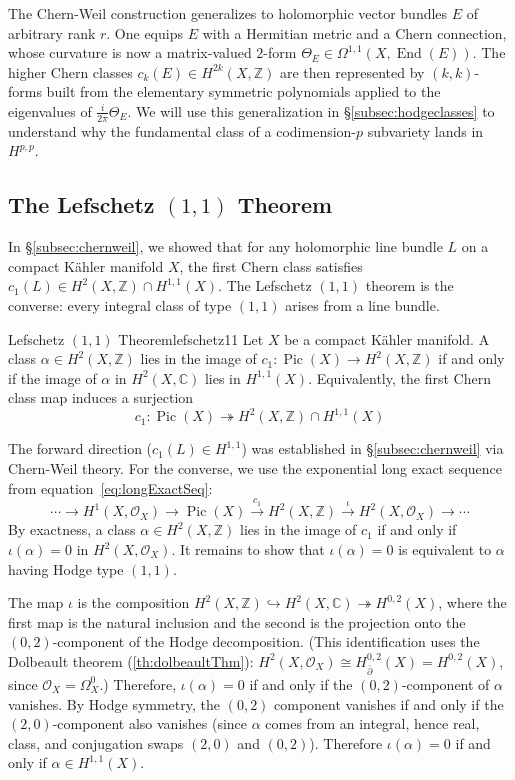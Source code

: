 \documentclass{article}
\newcommand{\C}{\mathbb{C}}
\newcommand{\Z}{{\mathbb{Z}}}
\newcommand{\CO}{\mathcal{O}}
\newcommand{\Pic}{\operatorname{Pic}}
\newcommand{\End}{\operatorname{End}}
\newenvironment{Proof}[1][]
  {\begin{ProofTcb}[#1]}
  {\end{ProofTcb}}
\begin{document}
The Chern-Weil construction generalizes to holomorphic vector bundles $E$ of
arbitrary rank $r$. One equips $E$ with a Hermitian metric and a Chern
connection, whose curvature is now a matrix-valued $2$-form
$\Theta_E \in \Omega^{1,1}(X, \End(E))$. The higher Chern classes
$c_k(E) \in H^{2k}(X, \Z)$ are then represented by $(k,k)$-forms built from
the elementary symmetric polynomials applied to the eigenvalues of
$\frac{i}{2\pi}\Theta_E$. We will use this generalization in
\S\ref{subsec:hodgeclasses} to understand why the fundamental class of a
codimension-$p$ subvariety lands in $H^{p,p}$.

\subsection{The Lefschetz $(1,1)$ Theorem}\label{subsec:lefschetz}

In \S\ref{subsec:chernweil}, we showed that for any holomorphic line bundle $L$
on a compact K\"{a}hler manifold $X$, the first Chern class satisfies
$c_1(L) \in H^2(X, \Z) \cap H^{1,1}(X)$. The Lefschetz $(1,1)$ theorem is the
converse: every integral class of type $(1,1)$ arises from a line bundle.

\begin{thm}{Lefschetz $(1,1)$ Theorem}{lefschetz11}
  Let $X$ be a compact K\"{a}hler manifold. A class
  $\alpha \in H^2(X, \Z)$ lies in the image of
  $c_1: \Pic(X) \to H^2(X, \Z)$ if and only if the image of $\alpha$ in
  $H^2(X, \C)$ lies in $H^{1,1}(X)$. Equivalently, the first Chern class map
  induces a surjection
  \[
    c_1: \Pic(X) \twoheadrightarrow H^2(X, \Z) \cap H^{1,1}(X)
  \]
\end{thm}

\begin{Proof}[sketch]
  The forward direction ($c_1(L) \in H^{1,1}$) was established in
  \S\ref{subsec:chernweil} via Chern-Weil theory. For the converse, we use
  the exponential long exact sequence from equation~\eqref{eq:longExactSeq}:
  \[
    \cdots \longrightarrow H^1(X, \CO_X) \longrightarrow \Pic(X)
      \xrightarrow{\;c_1\;} H^2(X, \Z) \xrightarrow{\;\iota\;}
      H^2(X, \CO_X) \longrightarrow \cdots
  \]
  By exactness, a class $\alpha \in H^2(X, \Z)$ lies in the image of $c_1$ if
  and only if $\iota(\alpha) = 0$ in $H^2(X, \CO_X)$. It remains to show that
  $\iota(\alpha) = 0$ is equivalent to $\alpha$ having Hodge type $(1,1)$.

  The map $\iota$ is the composition
  $H^2(X, \Z) \hookrightarrow H^2(X, \C) \twoheadrightarrow H^{0,2}(X)$,
  where the first map is the natural inclusion and the second is the projection
  onto the $(0,2)$-component of the Hodge decomposition. (This identification
  uses the Dolbeault theorem (\ref{th:dolbeaultThm}):
  $H^2(X, \CO_X) \cong H^{0,2}_{\bar\partial}(X) = H^{0,2}(X)$, since
  $\CO_X = \Omega^0_X$.) Therefore, $\iota(\alpha) = 0$ if and only if the
  $(0,2)$-component of $\alpha$ vanishes. By Hodge symmetry, the $(0,2)$
  component vanishes if and only if the $(2,0)$-component also vanishes
  (since $\alpha$ comes from an integral, hence real, class, and conjugation
  swaps $(2,0)$ and $(0,2)$). Therefore $\iota(\alpha) = 0$ if and only if
  $\alpha \in H^{1,1}(X)$.
\end{Proof}
\end{document}
